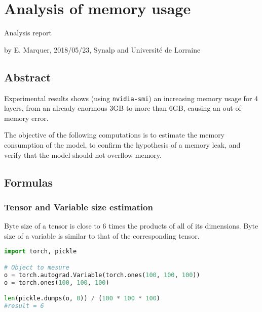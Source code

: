 \section*{Analysis of memory usage}

Analysis report

by E. Marquer, 2018/05/23, Synalp and Université de Lorraine

\subsection{Abstract}

Experimental results shows (using \lstinline!nvidia-smi!) an increasing
memory usage for 4 layers, from an already enormous 3GB to more than
6GB, causing an out-of-memory error.

The objective of the following computations is to estimate the memory
consumption of the model, to confirm the hypothesis of a memory leak,
and verify that the model should not overflow memory.

\subsection{Formulas}

\subsubsection{Tensor and Variable size
estimation}

Byte size of a tensor is close to 6 times the products of all of its
dimensions. Byte size of a variable is similar to that of the
corresponding tensor.

\begin{lstlisting}[language=Python]
import torch, pickle

# Object to mesure
o = torch.autograd.Variable(torch.ones(100, 100, 100))
o = torch.ones(100, 100, 100)

len(pickle.dumps(o, 0)) / (100 * 100 * 100)
#result = 6
\end{lstlisting}

